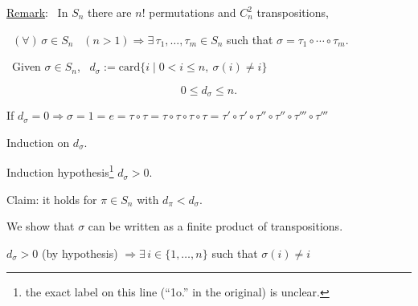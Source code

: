 \documentclass[12pt]{article}
\begin{document}
\bigskip
\noindent\underline{Remark}: \ In $S_n$ there are $n!$ permutations and $C_n^2$ transpositions,

\bigskip
\noindent{} \ $(\forall)\,\sigma\in S_n$ \ $(n>1) \Rightarrow \exists\,\tau_1,\ldots,\tau_m\in S_n$ such that $\sigma=\tau_1\circ\cdots\circ\tau_m$.

\bigskip
\noindent{} \ Given $\sigma\in S_n$, \ $d_\sigma := \text{card}\{i \mid 0<i\leq n,\ \sigma(i)\neq i\}$

\[
0\leq d_\sigma\leq n.
\]

\bigskip
\noindent If $d_\sigma=0 \Rightarrow \sigma=1=e=\tau\circ\tau=\tau\circ\tau\circ\tau\circ\tau=\tau'\circ\tau'\circ\tau''\circ\tau''\circ\tau'''\circ\tau'''$

\bigskip
\noindent Induction on $d_\sigma$.

\noindent Induction hypothesis\footnote{the exact label on this line (``1o.'' in the original) is unclear.} $d_\sigma>0$.

\bigskip
\noindent Claim: it holds for $\pi\in S_n$ with $d_\pi<d_\sigma$.

\noindent We show that $\sigma$ can be written as a finite product of transpositions.

\noindent $d_\sigma>0$ (by hypothesis) $\Rightarrow \exists\,i\in\{1,\ldots,n\}$ such that $\sigma(i)\neq i$
\end{document}
